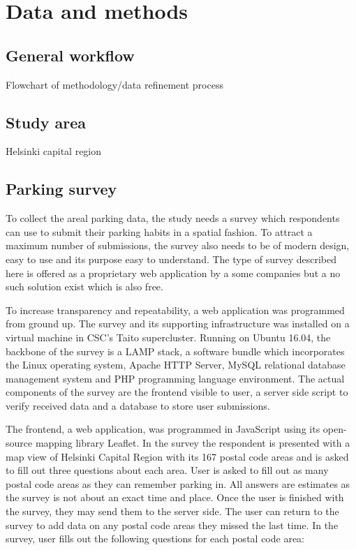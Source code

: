 \section{Data and methods}
\subsection{General workflow}
\justify
Flowchart of methodology/data refinement process

\subsection{Study area}
\justify
Helsinki capital region

\subsection{Parking survey}
\justify
To collect the areal parking data, the study needs a survey which respondents can use to submit their parking habits in a spatial fashion. To attract a maximum number of submissions, the survey also needs to be of modern design, easy to use and its purpose easy to understand. The type of survey described here is offered as a proprietary web application by a some companies but a no such solution exist which is also free. 

To increase transparency and repeatability, a web application was programmed from ground up. The survey and its supporting infrastructure was installed on a virtual machine in CSC's Taito supercluster. Running on Ubuntu 16.04, the backbone of the survey is a LAMP stack, a software bundle which incorporates the Linux operating system, Apache HTTP Server, MySQL relational database management system and PHP programming language environment. The actual components of the survey are the frontend visible to user, a server side script to verify received data and a database to store user submissions. 

The frontend, a web application, was programmed in JavaScript using its open-source mapping library Leaflet. In the survey the respondent is presented with a map view of Helsinki Capital Region with its 167 postal code areas and is asked to fill out three questions about each area. User is asked to fill out as many postal code areas as they can remember parking in. All answers are estimates as the survey is not about an exact time and place. Once the user is finished with the survey, they may send them to the server side. The user can return to the survey to add data on any postal code areas they missed the last time. In the survey, user fills out the following questions for each postal code area:

